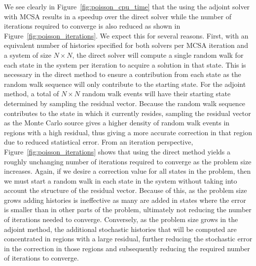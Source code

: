 We see clearly in Figure~\ref{fig:poisson_cpu_time} that the using the
adjoint solver with MCSA results in a speedup over the direct solver
while the number of iterations required to converge is also reduced as
shown in Figure~\ref{fig:poisson_iterations}. We expect this for
several reasons. First, with an equivalent number of histories
specified for both solvers per MCSA iteration and a system of size $N
\times N$, the direct solver will compute a single random walk for
each state in the system per iteration to acquire a solution in that
state. This is necessary in the direct method to ensure a contribution
from each state as the random walk sequence will only contribute to
the starting state. For the adjoint method, a total of $N \times N$
random walk events will have their starting state determined by
sampling the residual vector. Because the random walk sequence
contributes to the state in which it currently resides, sampling the
residual vector as the Monte Carlo source gives a higher density of
random walk events in regions with a high residual, thus giving a more
accurate correction in that region due to reduced statistical
error. From an iteration perspective,
Figure~\ref{fig:poisson_iterations} shows that using the direct method
yields a roughly unchanging number of iterations required to converge
as the problem size increases. Again, if we desire a correction value
for all states in the problem, then we must start a random walk in
each state in the system without taking into account the structure of
the residual vector. Because of this, as the problem size grows adding
histories is ineffective as many are added in states where the error
is smaller than in other parts of the problem, ultimately not reducing
the number of iterations needed to converge. Conversely, as the
problem size grows in the adjoint method, the additional stochastic
histories that will be computed are concentrated in regions with a
large residual, further reducing the stochastic error in the
correction in those regions and subsequently reducing the required
number of iterations to converge.


